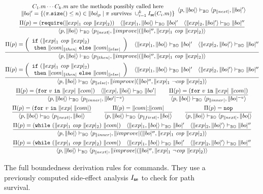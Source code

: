 \begin{figure}[t]
\begin{gather*}
{\begin{array}{c}
          \text{$C_1.m\cdots C_k.m$ are the methods possibly called here}\\
          \|bo|'=\{(\size{\pi}\le n)\in\|bo|_p\mid\pi\text{ survives }\cup_{i=1}^k\intsideeffect(C_i.m)\}
      \end{array}}{\pair{p}{\|bo|}\boderivation\pair{p_{\|next|}}{\|bo|'}}\\[1pt]
      \frac{\Pi(p)=(\require{\exp_1}{\exp_2})\quad\pair{\exp_1}{\|bo|}\boderivation\|bo|'\quad\pair{\exp_2}{\|bo|'}\boderivation\|bo|''}{\pair{p}{\|bo|}\boderivation{\pair{p_{\|next|}}{\|improve|(\|bo|'',\cop{\exp_1}{\exp_2})}}}\\[1pt]
      \frac{\Pi(p)=\left(\ifetwo{\exp_1}{\exp_2}{\com_{\|then|}}{\com_{\|else|}}\right)\quad\pair{\exp_1}{\|bo|}\boderivation\|bo|'\quad\pair{\exp_2}{\|bo|'}\boderivation\|bo|''}{\pair{p}{\|bo|}\boderivation\pair{p_{\|then|}}{\|improve|(\|bo|'',\cop{\exp_1}{\exp_2})}}\\[1pt]
      \frac{\Pi(p)=\left(\ifetwo{\exp_1}{\exp_2}{\com_{\|then|}}{\com_{\|else|}}\right)\quad\pair{\exp_1}{\|bo|}\boderivation\|bo|'\quad\pair{\exp_2}{\|bo|'}\boderivation\|bo|''}{\pair{p}{\|bo|}\boderivation\pair{p_{\|else|}}{\|improve|(\|bo|'',\negcop{\exp_1}{\exp_2})}}\\[1pt]
      \frac{\Pi(p)=(\for{v}{\exp}{\com})\quad\pair{\exp}{\|bo|}\boderivation\|bo'|}
           {\pair{p}{\|bo|}\boderivation\pair{p_{\|inner|}}{\|bo'|^{-v}}}\qquad
      \frac{\Pi(p)=(\for{v}{\exp}{\com})}
           {\pair{p}{\|bo|}\boderivation\pair{p_{\|inner|}}{\|bo|^{-v}}}\\[1pt]
      \frac{\Pi(p)=(\for{v}{\exp}{\com})}
           {\pair{p}{\|bo|}\boderivation\pair{p_{\|next|}}{\|bo|}}\qquad
      \frac{\Pi(p)=\sequence{\com}{\com}}
           {\pair{p}{\|bo|}\boderivation\pair{p_{\|first|}}{\|bo|}}\qquad
      \frac{\Pi(p)=\nop}
           {\pair{p}{\|bo|}\boderivation\pair{p_{\|next|}}{\|bo|}}\\[1pt]
      \frac{\Pi(p)=(\while{\exp_1}{\exp_2}{\com})\quad\pair{\exp_1}{\|bo|}\boderivation\|bo|'
           \quad\pair{\exp_2}{\|bo|'}\boderivation\|bo|''}
           {\pair{p}{\|bo|}\boderivation\pair{p_{\|inner|}}{\|improve|(\|bo|'',\cop{\exp_1}{\exp_2})}}\\[1pt]
      \frac{\Pi(p)=(\while{\exp_1}{\exp_2}{\com})\quad\pair{\exp_1}{\|bo|}\boderivation\|bo|'
           \quad\pair{\exp_2}{\|bo|'}\boderivation\|bo|''}
           {\pair{p}{\|bo|}\boderivation\pair{p_{\|next|}}{\|improve|(\|bo|'',\negcop{\exp_1}{\exp_2})}}\\[1pt]
  \end{gather*}
  \caption{The full boundedness derivation rules for commands. They use
    a previously computed side-effect analysis $I_{\mathsf{se}}$ to check for path survival.}
  \label{fig:bo_derivations_commands_full}
\end{figure}

